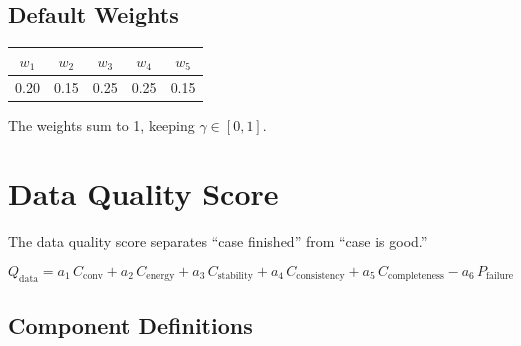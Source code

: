 \documentclass[11pt]{article}
\newcommand{\var}[1]{\ensuremath{\mathrm{#1}}}
\newcommand{\cvar}[1]{\ensuremath{C_{\mathrm{#1}}}}
\begin{document}
\subsection{Default Weights}

\begin{center}
\begin{tabular}{ccccc}
\toprule
$w_1$ & $w_2$ & $w_3$ & $w_4$ & $w_5$ \\
\midrule
0.20 & 0.15 & 0.25 & 0.25 & 0.15 \\
\bottomrule
\end{tabular}
\end{center}

\noindent
The weights sum to 1, keeping $\gamma \in [0,1]$.

\section{Data Quality Score}
\label{sec:qdata}

The data quality score separates ``case finished'' from ``case is good.''

\begin{equation}
  \label{eq:qdata}
  \boxed{
  Q_\var{data} = a_1\,\cvar{conv}
               + a_2\,\cvar{energy}
               + a_3\,\cvar{stability}
               + a_4\,\cvar{consistency}
               + a_5\,\cvar{completeness}
               - a_6\,P_\var{failure}
  }
\end{equation}

\subsection{Component Definitions}
\end{document}
